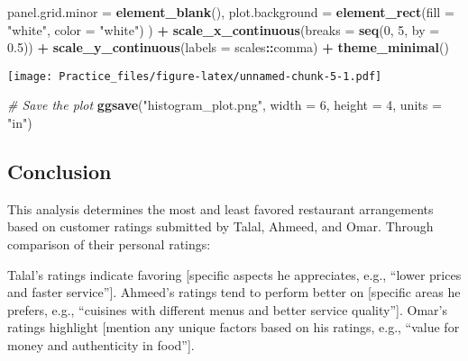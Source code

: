 \documentclass[
]{article}
\newenvironment{Shaded}{\begin{snugshade}}{\end{snugshade}}
\newcommand{\AttributeTok}[1]{\textcolor[rgb]{0.13,0.29,0.53}{#1}}
\newcommand{\CommentTok}[1]{\textcolor[rgb]{0.56,0.35,0.01}{\textit{#1}}}
\newcommand{\DecValTok}[1]{\textcolor[rgb]{0.00,0.00,0.81}{#1}}
\newcommand{\FloatTok}[1]{\textcolor[rgb]{0.00,0.00,0.81}{#1}}
\newcommand{\FunctionTok}[1]{\textcolor[rgb]{0.13,0.29,0.53}{\textbf{#1}}}
\newcommand{\NormalTok}[1]{#1}
\newcommand{\SpecialCharTok}[1]{\textcolor[rgb]{0.81,0.36,0.00}{\textbf{#1}}}
\newcommand{\StringTok}[1]{\textcolor[rgb]{0.31,0.60,0.02}{#1}}
\begin{document}
\begin{Shaded}
\begin{Highlighting}[]
    \AttributeTok{panel.grid.minor =} \FunctionTok{element\_blank}\NormalTok{(),}
    \AttributeTok{plot.background =} \FunctionTok{element\_rect}\NormalTok{(}\AttributeTok{fill =} \StringTok{"white"}\NormalTok{, }\AttributeTok{color =} \StringTok{"white"}\NormalTok{)}
\NormalTok{  ) }\SpecialCharTok{+}
  \FunctionTok{scale\_x\_continuous}\NormalTok{(}\AttributeTok{breaks =} \FunctionTok{seq}\NormalTok{(}\DecValTok{0}\NormalTok{, }\DecValTok{5}\NormalTok{, }\AttributeTok{by =} \FloatTok{0.5}\NormalTok{)) }\SpecialCharTok{+}
  \FunctionTok{scale\_y\_continuous}\NormalTok{(}\AttributeTok{labels =}\NormalTok{ scales}\SpecialCharTok{::}\NormalTok{comma) }\SpecialCharTok{+}
  \FunctionTok{theme\_minimal}\NormalTok{()}
\end{Highlighting}
\end{Shaded}

\texttt{[image: Practice\_files/figure-latex/unnamed-chunk-5-1.pdf]}

\begin{Shaded}
\begin{Highlighting}[]
\CommentTok{\# Save the plot}
\FunctionTok{ggsave}\NormalTok{(}\StringTok{"histogram\_plot.png"}\NormalTok{, }\AttributeTok{width =} \DecValTok{6}\NormalTok{, }\AttributeTok{height =} \DecValTok{4}\NormalTok{, }\AttributeTok{units =} \StringTok{"in"}\NormalTok{)}
\end{Highlighting}
\end{Shaded}

\subsection{Conclusion}\label{conclusion}

This analysis determines the most and least favored restaurant
arrangements based on customer ratings submitted by Talal, Ahmeed, and
Omar. Through comparison of their personal ratings:

Talal's ratings indicate favoring {[}specific aspects he appreciates,
e.g., ``lower prices and faster service''{]}. Ahmeed's ratings tend to
perform better on {[}specific areas he prefers, e.g., ``cuisines with
different menus and better service quality''{]}. Omar's ratings
highlight {[}mention any unique factors based on his ratings, e.g.,
``value for money and authenticity in food''{]}.
\end{document}

